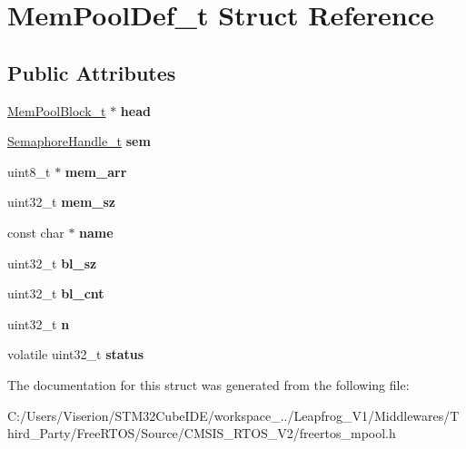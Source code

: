 \hypertarget{struct_mem_pool_def__t}{}\section{Mem\+Pool\+Def\+\_\+t Struct Reference}
\label{struct_mem_pool_def__t}
\subsection*{Public Attributes}
\begin{DoxyCompactItemize}
\item 
\mbox{\label{struct_mem_pool_def__t_ad1f539c9838255451dbd9b4eabf89bf3}} 
\mbox{\hyperlink{struct_mem_pool_block__t}{Mem\+Pool\+Block\+\_\+t}} $\ast$ {\bfseries head}
\item 
\mbox{\label{struct_mem_pool_def__t_a419a1bb2902914f7c890c4a6306e9459}} 
\mbox{\hyperlink{struct_queue_definition}{Semaphore\+Handle\+\_\+t}} {\bfseries sem}
\item 
\mbox{\label{struct_mem_pool_def__t_a3e0cdb18ef901e5aa739542396ac0abc}} 
uint8\+\_\+t $\ast$ {\bfseries mem\+\_\+arr}
\item 
\mbox{\label{struct_mem_pool_def__t_a913622747c8e449d6fb0758e468cbe4b}} 
uint32\+\_\+t {\bfseries mem\+\_\+sz}
\item 
\mbox{\label{struct_mem_pool_def__t_add14aa7ad63751f794c6418111c8de10}} 
const char $\ast$ {\bfseries name}
\item 
\mbox{\label{struct_mem_pool_def__t_a3f23b4d7db508e8dff3a900710dd2277}} 
uint32\+\_\+t {\bfseries bl\+\_\+sz}
\item 
\mbox{\label{struct_mem_pool_def__t_a6b60a6cdec4d73325af6789243c60cc7}} 
uint32\+\_\+t {\bfseries bl\+\_\+cnt}
\item 
\mbox{\label{struct_mem_pool_def__t_a0150d8854edf3b0d4629b316eae60c22}} 
uint32\+\_\+t {\bfseries n}
\item 
\mbox{\label{struct_mem_pool_def__t_ad6bf5c42e1ed231d6cbafefdf7ad5f4a}} 
volatile uint32\+\_\+t {\bfseries status}
\end{DoxyCompactItemize}


The documentation for this struct was generated from the following file\+:\begin{DoxyCompactItemize}
\item 
C\+:/\+Users/\+Viserion/\+S\+T\+M32\+Cube\+I\+D\+E/workspace\+\_../\+Leapfrog\+\_\+\+V1/\+Middlewares/\+Third\+\_\+\+Party/\+Free\+R\+T\+O\+S/\+Source/\+C\+M\+S\+I\+S\+\_\+\+R\+T\+O\+S\+\_\+\+V2/freertos\+\_\+mpool.\+h\end{DoxyCompactItemize}
